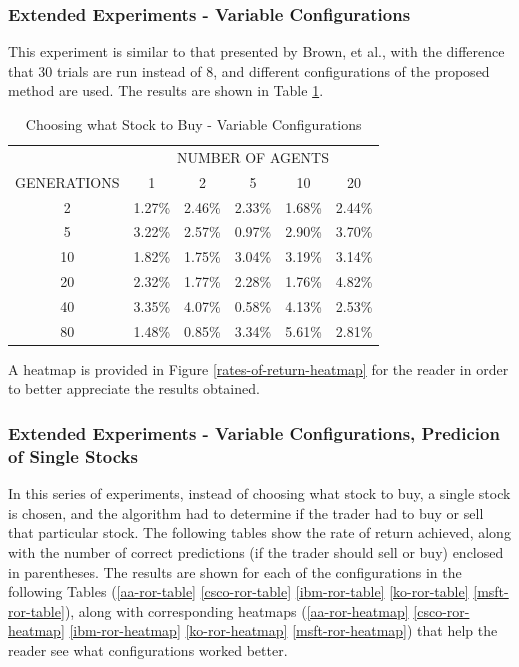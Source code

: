 \documentclass[a4paper,twoside]{article}
\begin{document}
\subsubsection{Extended Experiments - Variable Configurations}

This experiment is similar to that presented by Brown, et al., with the difference that 30 trials are run instead of 8, and different configurations of the proposed method are used. The results are shown in Table \ref{table-rates-of-return}.

\begin{table}
\caption{{Choosing what Stock to Buy - Variable Configurations}}
\label{table-rates-of-return}
    \begin{tabular}{ c c c c c c }
         & \multicolumn{5}{c}{NUMBER OF AGENTS} \\ 
        GENERATIONS & 1      & 2      & 5      & 10     & 20     \\
            2       & 1.27\% & 2.46\% & 2.33\% & 1.68\% & 2.44\% \\ 
            5       & 3.22\% & 2.57\% & 0.97\% & 2.90\% & 3.70\% \\ 
            10      & 1.82\% & 1.75\% & 3.04\% & 3.19\% & 3.14\% \\ 
            20      & 2.32\% & 1.77\% & 2.28\% & 1.76\% & 4.82\% \\ 
            40      & 3.35\% & 4.07\% & 0.58\% & 4.13\% & 2.53\% \\ 
            80      & 1.48\% & 0.85\% & 3.34\% & 5.61\% & 2.81\% \\ 
    \end{tabular} 
\end{table}

A heatmap is provided in Figure \ref{rates-of-return-heatmap} for the reader in order to better appreciate the results obtained.

\subsubsection{Extended Experiments - Variable Configurations, Predicion of Single Stocks}

In this series of experiments, instead of choosing what stock to buy, a single stock is chosen, and the algorithm had to determine if the trader had to buy or sell that particular stock. The following tables show the rate of return achieved, along with the number of correct predictions (if the trader should sell or buy) enclosed in parentheses. The results are shown for each of the configurations in the following Tables (\ref{aa-ror-table} \ref{csco-ror-table} \ref{ibm-ror-table} \ref{ko-ror-table} \ref{msft-ror-table}), along with corresponding heatmaps (\ref{aa-ror-heatmap} \ref{csco-ror-heatmap} \ref{ibm-ror-heatmap} \ref{ko-ror-heatmap} \ref{msft-ror-heatmap}) that help the reader see what configurations worked better.
\end{document}
